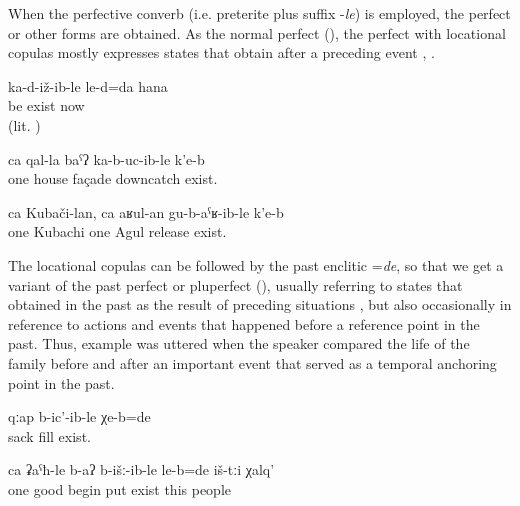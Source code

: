 When the perfective converb (i.e. preterite plus suffix -\textit{le}) is employed, the perfect or other forms are obtained. As the normal perfect (), the perfect with locational copulas mostly expresses states that obtain after a preceding event , .
%
\begin{exe}
	\ex	\label{ex:‎(Then I relaxed) and we lived normally}
	\gll	ka-d-iž-ib-le	le-d=da	hana\\
		be	exist	now\\
	\glt	{} (lit. )

	\ex	\label{ex:(The plant) has covered one wall of the house (by growing upwards).}
	\gll	ca	qal-la	baˁʔ	ka-b-uc-ib-le	k'e-b\\
		one	house	façade	downcatch	exist.\\
	\glt	{}
	
		\ex	\label{ex:‎One Kubachi person, one Agul person are buried (in Sanzhi)}
	\gll	ca	Kubači-lan,	ca	aʁul-an	gu-b-aˁʁ-ib-le	k'e-b\\
		one	Kubachi	one	Agul	release	exist.\\
	\glt	{}
\end{exe}


The locational copulas can be followed by the past enclitic =\textit{de}, so that we get a variant of the past perfect or pluperfect (), usually referring to states that obtained in the past as the result of preceding situations , but also occasionally in reference to actions and events that happened before a reference point in the past. Thus, example  was uttered when the speaker compared the life of the family before and after an important event that served as a temporal anchoring point in the past.
%
\begin{exe}
	\ex	\label{ex:The sack was full filled}
	\gll	qːap	b-ic'-ib-le	χe-b=de\\
		sack	fill	exist.\\
	\glt	{}

	\ex	\label{ex:The people started well}
	\gll	ca	ʡaˁħ-le	b-aʔ	b-išː-ib-le	le-b=de	iš-tːi	χalq'\\
		one	good	begin	put	exist	this	people\\
	\glt	{}
\end{exe}

